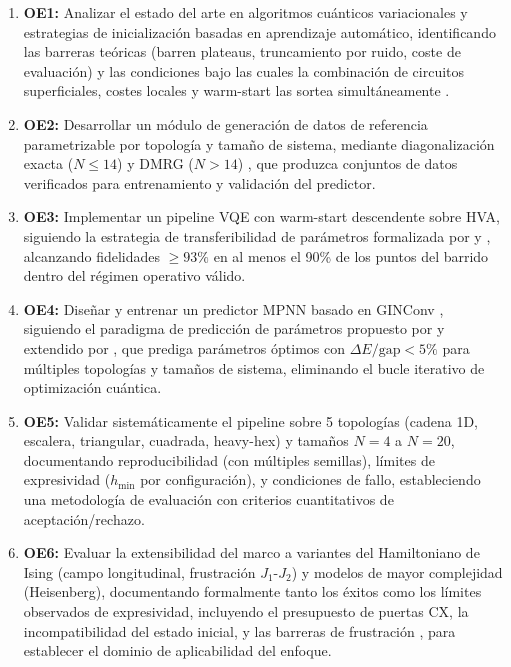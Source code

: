 \documentclass[11pt,a4paper,spanish]{book}
\begin{document}
\begin{enumerate}
    \item \textbf{OE1:} Analizar el estado del arte en algoritmos cuánticos variacionales y estrategias de inicialización basadas en aprendizaje automático, identificando las barreras teóricas (barren plateaus, truncamiento por ruido, coste de evaluación) y las condiciones bajo las cuales la combinación de circuitos superficiales, costes locales y warm-start las sortea simultáneamente \citep{mele2026, cerezo2021, wiersema2020}.

    \item \textbf{OE2:} Desarrollar un módulo de generación de datos de referencia parametrizable por topología y tamaño de sistema, mediante diagonalización exacta ($N \leq 14$) y DMRG ($N > 14$) \citep{hauschild2018}, que produzca conjuntos de datos verificados para entrenamiento y validación del predictor.

    \item \textbf{OE3:} Implementar un pipeline VQE con warm-start descendente sobre HVA, siguiendo la estrategia de transferibilidad de parámetros formalizada por \citet{mele2022} y \citet{puig2025}, alcanzando fidelidades $\geq 93\%$ en al menos el 90\% de los puntos del barrido dentro del régimen operativo válido.

    \item \textbf{OE4:} Diseñar y entrenar un predictor MPNN basado en GINConv \citep{xu2019}, siguiendo el paradigma de predicción de parámetros propuesto por \citet{miao2024} y extendido por \citet{zhang2025}, que prediga parámetros óptimos con $\Delta E/\text{gap} < 5\%$ para múltiples topologías y tamaños de sistema, eliminando el bucle iterativo de optimización cuántica.

    \item \textbf{OE5:} Validar sistemáticamente el pipeline sobre 5 topologías (cadena 1D, escalera, triangular, cuadrada, heavy-hex) y tamaños $N = 4$ a $N = 20$, documentando reproducibilidad (con múltiples semillas), límites de expresividad ($h_{\min}$ por configuración), y condiciones de fallo, estableciendo una metodología de evaluación con criterios cuantitativos de aceptación/rechazo.

    \item \textbf{OE6:} Evaluar la extensibilidad del marco a variantes del Hamiltoniano de Ising (campo longitudinal, frustración $J_1$-$J_2$) y modelos de mayor complejidad (Heisenberg), documentando formalmente tanto los éxitos como los límites observados de expresividad, incluyendo el presupuesto de puertas CX, la incompatibilidad del estado inicial, y las barreras de frustración \citep{huang2026frustration}, para establecer el dominio de aplicabilidad del enfoque.
\end{enumerate}
\end{document}
